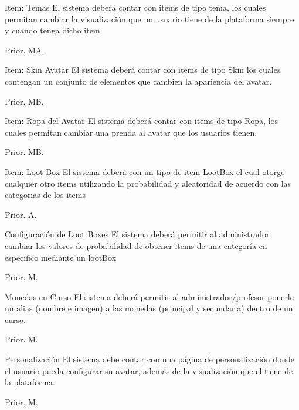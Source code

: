 \begin{RF}{Item: Temas}{%
    El sistema deberá contar con items de tipo tema, los cuales permitan cambiar la visualización que un usuario tiene de la plataforma siempre y cuando tenga dicho item}
    \item[] Prior. MA. %
\end{RF}

\begin{RF}{Item: Skin Avatar}{%
    El sistema deberá contar con items de tipo Skin los cuales contengan un conjunto de elementos que cambien la apariencia del avatar. }
    \item[] Prior. MB. %
\end{RF}

\begin{RF}{Item: Ropa del Avatar}{%
    El sistema deberá contar con items de tipo Ropa, los cuales permitan cambiar una prenda al avatar que los usuarios tienen.}
    \item[] Prior. MB. %
\end{RF}

\begin{RF}{Item: Loot-Box}{%
    El sistema deberá con un tipo de item LootBox el cual otorge cualquier otro items utilizando la probabilidad y aleatoridad de acuerdo con las categorias de los items}
    \item[] Prior. A. %
\end{RF}

\begin{RF}{Configuración de Loot Boxes}{%
    El sistema deberá permitir al administrador cambiar los valores de probabilidad de obtener items de una categoría en especifico mediante un lootBox}
    \item[] Prior. M. %
\end{RF}

\begin{RF}{Monedas en Curso}{%
    El sistema deberá permitir al administrador/profesor ponerle un alias (nombre e imagen) a las monedas (principal y secundaria) dentro de un curso.}
    \item[] Prior. M. %
\end{RF}

\begin{RF}{Personalización}{%
    El sistema debe contar con una página de personalización donde el usuario pueda configurar su avatar, además de la visualización que el tiene de la plataforma.}
    \item[] Prior. M. %
\end{RF}

